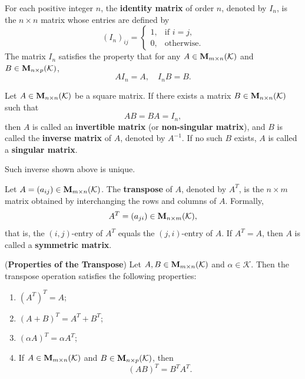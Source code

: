 \begin{definitionenv}
	For each positive integer $n$, the \textbf{identity matrix} of order $n$, denoted by $I_n$,
	is the $n \times n$ matrix whose entries are defined by
	\[
	(I_n)_{ij} =
	\begin{cases}
		1, & \text{if } i = j,\\
		0, & \text{otherwise}.
	\end{cases}
	\]
	The matrix $I_n$ satisfies the property that for any
	$A \in \mathbf{M}_{m \times n}(\mathcal{K})$ and
	$B \in \mathbf{M}_{n \times p}(\mathcal{K})$,
	\[
	AI_n = A, \quad I_nB = B.
	\]
\end{definitionenv}

\begin{definitionenv}
	Let $A \in \mathbf{M}_{n \times n}(\mathcal{K})$ be a square matrix.
	If there exists a matrix $B \in \mathbf{M}_{n \times n}(\mathcal{K})$ such that
	\[
	AB = BA = I_n,
	\]
	then $A$ is called an \textbf{invertible matrix} (or \textbf{non-singular matrix}),
	and $B$ is called the \textbf{inverse matrix} of $A$, denoted by $A^{-1}$. If no such $B$ exists, $A$ is called a \textbf{singular matrix}.
\end{definitionenv}

\begin{remarkenv}
	Such inverse shown above is unique.
\end{remarkenv}

\begin{definitionenv}
	Let $A = (a_{ij}) \in \mathbf{M}_{m \times n}(\mathcal{K})$.
	The \textbf{transpose} of $A$, denoted by $A^{T}$, is the $n \times m$ matrix obtained by interchanging the rows and columns of $A$.
	Formally,
	\[
	A^{T} = (a_{ji}) \in \mathbf{M}_{n \times m}(\mathcal{K}),
	\]
	that is, the $(i,j)$-entry of $A^{T}$ equals the $(j,i)$-entry of $A$. If $A^{T} = A$, then $A$ is called a \textbf{symmetric matrix}.
\end{definitionenv}

\begin{theoremenv}
	(\textbf{Properties of the Transpose})
	Let $A, B \in \mathbf{M}_{m \times n}(\mathcal{K})$ and $\alpha \in \mathcal{K}$.
	Then the transpose operation satisfies the following properties:
	\begin{enumerate}
		\item $(A^{T})^{T} = A$;
		\item $(A + B)^{T} = A^{T} + B^{T}$;
		\item $(\alpha A)^{T} = \alpha A^{T}$;
		\item If $A \in \mathbf{M}_{m \times n}(\mathcal{K})$ and
		$B \in \mathbf{M}_{n \times p}(\mathcal{K})$, then
		\[
		(AB)^{T} = B^{T}A^{T}.
		\]
	\end{enumerate}
\end{theoremenv}


